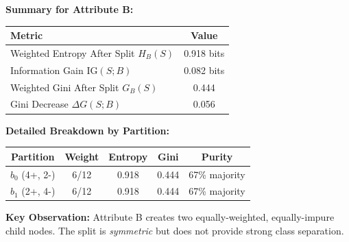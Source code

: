 \documentclass[12pt]{article}
\begin{document}
\begin{solution}
\textbf{Summary for Attribute B:}

\begin{center}
\begin{tabular}{|l|c|}
\hline
\textbf{Metric} & \textbf{Value} \\
\hline
Weighted Entropy After Split $H_B(S)$ & 0.918 bits \\
Information Gain $\text{IG}(S; B)$ & 0.082 bits \\
Weighted Gini After Split $G_B(S)$ & 0.444 \\
Gini Decrease $\Delta G(S; B)$ & 0.056 \\
\hline
\end{tabular}
\end{center}

\textbf{Detailed Breakdown by Partition:}

\begin{center}
\begin{tabular}{|c|c|c|c|c|}
\hline
\textbf{Partition} & \textbf{Weight} & \textbf{Entropy} & \textbf{Gini} & \textbf{Purity} \\
\hline
$b_0$ (4+, 2-) & 6/12 & 0.918 & 0.444 & 67\% majority \\
$b_1$ (2+, 4-) & 6/12 & 0.918 & 0.444 & 67\% majority \\
\hline
\end{tabular}
\end{center}

\textbf{Key Observation:} Attribute B creates two equally-weighted, equally-impure child nodes. The split is \textit{symmetric} but does not provide strong class separation.
\end{solution}
\end{document}
